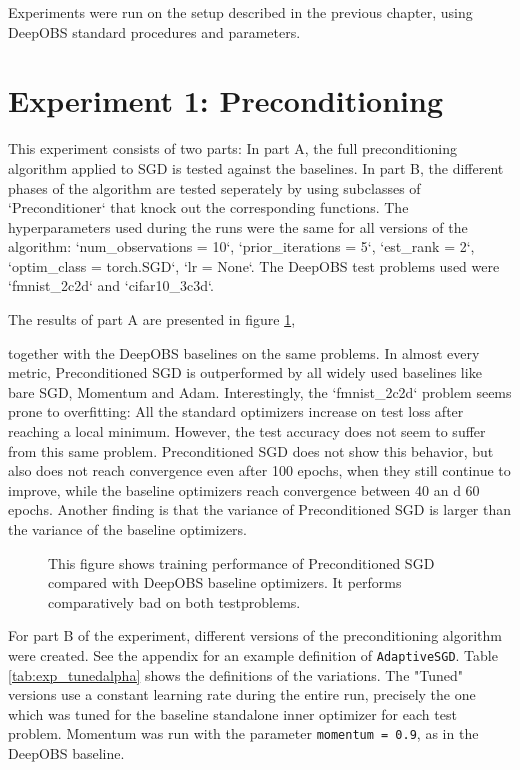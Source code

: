 \documentclass[twoside,12pt,a4paper]{report}
\begin{document}
Experiments were run on the setup described in the previous chapter, using DeepOBS standard procedures and parameters.

\section{Experiment 1: Preconditioning}
\begin{markdown}
This experiment consists of two parts: In part A, the full preconditioning algorithm applied to SGD is tested against the baselines.
In part B, the different phases of the algorithm are tested seperately by using subclasses of `Preconditioner` that knock out the corresponding functions.
The hyperparameters used during the runs were the same for all versions of the algorithm: `num_observations = 10`, `prior_iterations = 5`, `est_rank = 2`, `optim_class = torch.SGD`, `lr = None`. The DeepOBS test problems used were `fmnist_2c2d` and `cifar10_3c3d`.
\end{markdown}

The results of part A are presented in figure \ref{fig:exp_preconditioning},
\begin{markdown}
together with the DeepOBS baselines on the same problems. In almost every metric, Preconditioned SGD is outperformed by all widely used baselines like bare SGD, Momentum and Adam.
Interestingly, the `fmnist_2c2d` problem seems prone to overfitting: All the standard optimizers increase on test loss after reaching a local minimum. However, the test accuracy does not seem to suffer from this same problem.
Preconditioned SGD does not show this behavior, but also does not reach convergence even after 100 epochs, when they still continue to improve, while the baseline optimizers reach convergence between 40 an d 60 epochs.
Another finding is that the variance of Preconditioned SGD is larger than the variance of the baseline optimizers.

\end{markdown}
\begin{figure}
	
	\caption{This figure shows training performance of Preconditioned SGD\\
		 compared with DeepOBS baseline optimizers. It performs comparatively bad on both testproblems.}
	\label{fig:exp_preconditioning}
\end{figure}


For part B of the experiment, different versions of the preconditioning algorithm were created. See the appendix for an example definition of \verb|AdaptiveSGD|.
Table \ref{tab:exp_tunedalpha} shows the definitions of the variations. The "Tuned" versions use a constant learning rate during the entire run, precisely the one which was tuned for the baseline standalone inner optimizer for each test problem.
Momentum was run with the parameter \verb|momentum = 0.9|, as in the DeepOBS baseline.
\end{document}
